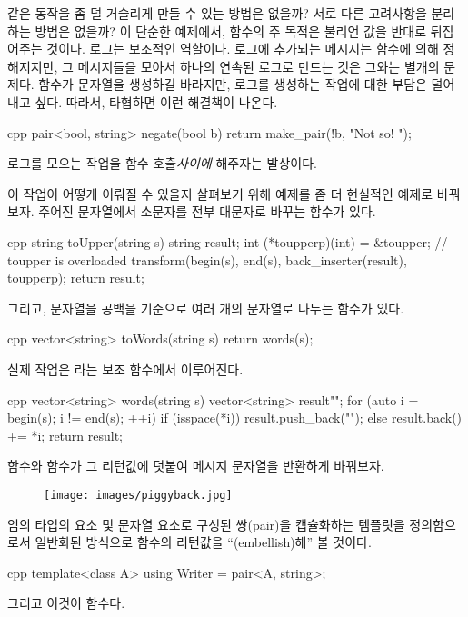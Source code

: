 같은 동작을 좀 덜 거슬리게 만들 수 있는 방법은 없을까? 서로 다른 고려사항을 분리하는 방법은 없을까? 이 단순한 예제에서,  함수의 주 목적은 불리언 값을 반대로 뒤집어주는 것이다.
로그는 보조적인 역할이다. 로그에 추가되는 메시지는 함수에 의해 정해지지만, 그 메시지들을 모아서 하나의 연속된 로그로 만드는 것은 그와는 별개의 문제다.
함수가 문자열을 생성하길 바라지만, 로그를 생성하는 작업에 대한 부담은 덜어내고 싶다. 따라서, 타협하면 이런 해결책이 나온다.

\begin{snip}{cpp}
pair<bool, string> negate(bool b) {
    return make_pair(!b, "Not so! ");
}
\end{snip}
로그를 모으는 작업을 함수 호출\emph{사이에} 해주자는 발상이다.

이 작업이 어떻게 이뤄질 수 있을지 살펴보기 위해 예제를 좀 더 현실적인 예제로 바꿔보자. 주어진 문자열에서 소문자를 전부 대문자로 바꾸는 함수가 있다.

\begin{snip}{cpp}
string toUpper(string s) {
    string result;
    int (*toupperp)(int) = &toupper; // toupper is overloaded
    transform(begin(s), end(s), back_inserter(result), toupperp);
    return result;
}
\end{snip}
그리고, 문자열을 공백을 기준으로 여러 개의 문자열로 나누는 함수가 있다.

\begin{snip}{cpp}
vector<string> toWords(string s) {
    return words(s);
}
\end{snip}
실제 작업은 라는 보조 함수에서 이루어진다.

\begin{snip}{cpp}
vector<string> words(string s) {
    vector<string> result{""};
    for (auto i = begin(s); i != end(s); ++i)
    {
        if (isspace(*i))
            result.push_back(""); 
        else
            result.back() += *i;
    }
    return result;
}
\end{snip}
 함수와  함수가 그 리턴값에 덧붙여 메시지 문자열을 반환하게 바꿔보자.

\begin{figure}[H]
\centering
\texttt{[image: images/piggyback.jpg]}
\end{figure}
\noindent
임의 타입의 요소 및 문자열 요소로 구성된 쌍(pair)을 캡슐화하는  템플릿을 정의함으로서 일반화된 방식으로 함수의 리턴값을 ``\trEmbellish(embellish)해'' 볼 것이다.

\begin{snip}{cpp}
template<class A>
using Writer = pair<A, string>;
\end{snip}
그리고 이것이  함수다.

